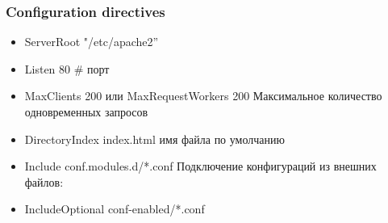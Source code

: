 \begin{frame}[fragile]
        \frametitle{Configuration directives}
\begin{itemize}
    \item ServerRoot "/etc/apache2” 
    \item Listen 80 \# порт
    \item MaxClients 200  или MaxRequestWorkers 200 
Максимальное количество одновременных запросов
    \item DirectoryIndex index.html имя файла по умолчанию
    \item Include conf.modules.d/*.conf Подключение конфигураций из внешних файлов:
    \item IncludeOptional conf-enabled/*.conf
\end{itemize}
\end{frame}
